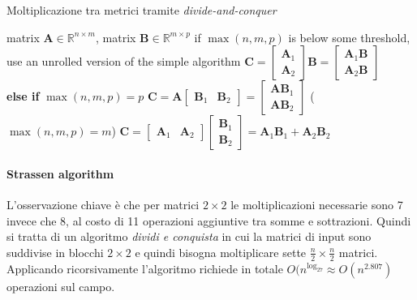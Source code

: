 \documentclass[10pt]{article}
\begin{document}
\begin{algorithm}
\caption{Moltiplicazione tra metrici tramite \textit{divide-and-conquer}}\label{alg:mul_div_conq}
\begin{algorithmic}[1]
\Require matrix $\mathbf{A} \in \mathbb{R}^{n\times m}$, matrix $\mathbf{B} \in \mathbb{R}^{m\times p}$
\State if $\max(n,m,p)$ is below some threshold, use an unrolled version of the simple algorithm
	\State $\mathbf{C} = \begin{bmatrix} \mathbf{A}_1 \\ \mathbf{A}_2 \end{bmatrix}\mathbf{B} = \begin{bmatrix} \mathbf{A}_1 \mathbf{B} \\ \mathbf{A}_2 \mathbf{B} \end{bmatrix}$ 
\\\textbf{else if} $\max(n,m,p) = p$
	\State $\mathbf{C} = \mathbf{A}\begin{bmatrix} \mathbf{B}_1 & \mathbf{B}_2 \end{bmatrix} = \begin{bmatrix} \mathbf{A} \mathbf{B}_1 \\ \mathbf{A} \mathbf{B}_2 \end{bmatrix}$ 
\Else \Comment($\max(n,m,p) = m$)
	\State $\mathbf{C} = \begin{bmatrix} \mathbf{A}_1 & \mathbf{A}_2 \end{bmatrix}\begin{bmatrix} \mathbf{B}_1 \\ \mathbf{B}_2 \end{bmatrix} = \mathbf{A}_1 \mathbf{B}_1 + \mathbf{A}_2 \mathbf{B}_2$ 
\EndIf
\end{algorithmic}
\end{algorithm}


\paragraph{Strassen algorithm}

L'osservazione chiave è che per matrici $2\times 2$ le moltiplicazioni necessarie sono 7 invece che 8, al costo di 11 operazioni aggiuntive tra somme e sottrazioni. Quindi si tratta di un algoritmo \textit{dividi e conquista} in cui la matrici di input sono suddivise in blocchi $2\times 2$ e quindi bisogna moltiplicare sette $\frac{n}{2}\times\frac{n}{2}$ matrici. Applicando ricorsivamente l'algoritmo richiede in totale $O(n^{\log_27}\approx O(n^{2.807})$ operazioni sul campo.
\end{document}
